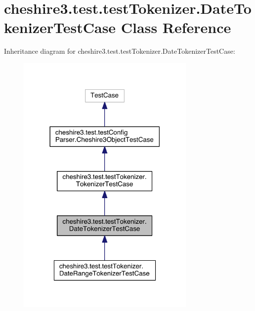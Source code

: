 \hypertarget{classcheshire3_1_1test_1_1test_tokenizer_1_1_date_tokenizer_test_case}{\section{cheshire3.\-test.\-test\-Tokenizer.\-Date\-Tokenizer\-Test\-Case Class Reference}
\label{classcheshire3_1_1test_1_1test_tokenizer_1_1_date_tokenizer_test_case}
}


Inheritance diagram for cheshire3.\-test.\-test\-Tokenizer.\-Date\-Tokenizer\-Test\-Case\-:
\nopagebreak
\begin{figure}[H]
\begin{center}
\leavevmode
\includegraphics[width=246pt]{classcheshire3_1_1test_1_1test_tokenizer_1_1_date_tokenizer_test_case__inherit__graph}
\end{center}
\end{figure}


